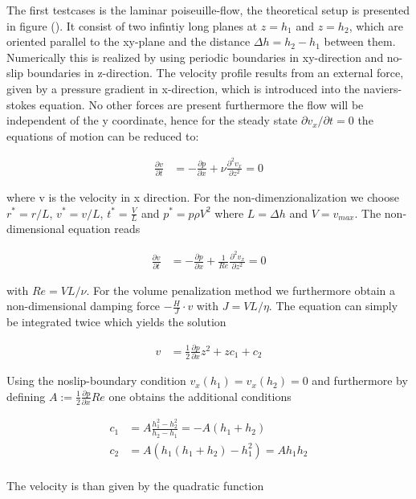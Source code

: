 The first testcases is the laminar poiseuille-flow, the theoretical setup is presented in figure ().
It consist of two infintiy long planes at $z=h_1$ and $z=h_2$, which are oriented
 parallel to the xy-plane and the distance $\Delta h = h_2 - h_1$ between them.
Numerically this is realized by using periodic boundaries in xy-direction and
no-slip boundaries in z-direction.
The velocity profile results from an external force, given by a
 pressure gradient in x-direction, which is introduced into the naviers-stokes equation.
No other forces are present furthermore the flow will be independent of the y coordinate,
hence for the steady state $\partial v_x /\partial t = 0$ the equations of motion can be reduced to:

\begin{align}
\frac{\partial v}{\partial t} &= - \frac{\partial p}{\partial x} + \nu \frac{\partial^2 v_x}{\partial z^2} = 0
\end{align}

where v is the velocity in x direction.
For the non-dimenzionalization we choose $r^* = r/L$, $v^*=v/L$, $t^* = \frac{V}{L}$
and $p^* = p \rho V^2$ where $L=\Delta h$ and $V=v_{max}$.
The non-dimensional equation reads

\begin{align}
\frac{\partial v}{\partial t} &= - \frac{\partial p}{\partial x}
 + \frac{1}{Re} \frac{\partial^2 v_x}{\partial z^2} = 0
\end{align}

with $Re = VL/\nu$.
For the volume penalization method we furthermore obtain a
non-dimensional damping force $-\frac{H}{J}\cdot v$ with $J = VL/\eta$.
The equation can simply be integrated twice which yields the solution

\begin{align}
v &= \frac{1}{2}\frac{\partial p}{\partial x}z^2 + zc_1 + c_2
\end{align}

Using the noslip-boundary condition $v_x(h_1) = v_x(h_2) = 0$ and furthermore by defining
$A:=\frac{1}{2}\frac{\partial p}{\partial x} Re$ one obtains the additional conditions

\begin{align}
c_1 &= A\frac{h_1^2 -h_2^2}{h_2 - h_1} = -A(h_1+h_2)\\
c_2 &= A(h_1(h_1 + h_2) - h_1^2) = Ah_1h_2\\
\end{align}

The velocity is than given by the quadratic function

